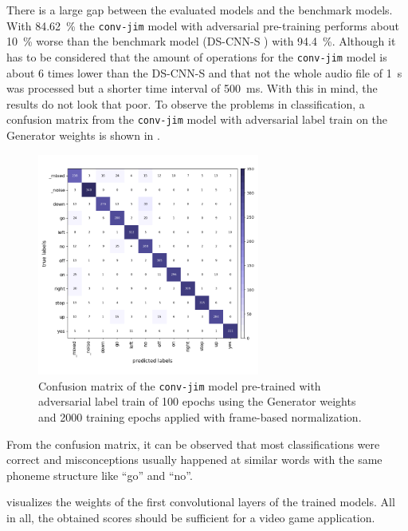 There is a large gap between the evaluated models and the benchmark models.
With \SI{84.62}{\percent} the \texttt{conv-jim} model with adversarial pre-training performs about \SI{10}{\percent} worse than the benchmark model (DS-CNN-S \cite{Zhang2017HelloEdge}) with \SI{94.4}{\percent}.
Although it has to be considered that the amount of operations for the \texttt{conv-jim} model is about 6 times lower than the DS-CNN-S and that not the whole audio file of \SI{1}{\second} was processed but a shorter time interval of \SI{500}{\milli\second}.
With this in mind, the results do not look that poor.
To observe the problems in classification, a confusion matrix from the \texttt{conv-jim} model with adversarial label train on the Generator weights is shown in .
\begin{figure}[!ht]
  \centering
  \includegraphics[width=0.65\textwidth]{./5_exp/figs/exp_final_confusion.png}
  \caption{Confusion matrix of the \texttt{conv-jim} model pre-trained with adversarial label train of 100 epochs using the Generator weights and 2000 training epochs applied with frame-based normalization.}
  \label{fig:exp_final_confusion}
\end{figure}
\FloatBarrier
\noindent
From the confusion matrix, it can be observed that most classifications were correct and misconceptions usually happened at similar words with the same phoneme structure like \enquote{go} and \enquote{no}.

 visualizes the weights of the first convolutional layers of the trained models.
All in all, the obtained scores should be sufficient for a video game application.